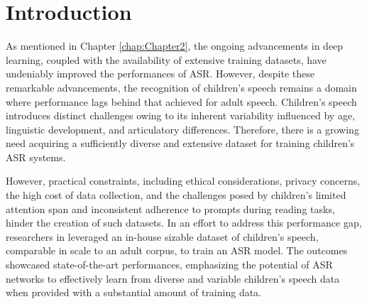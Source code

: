 \label{chap:6}
\cleardoublepage


\section{Introduction}
As mentioned in Chapter \ref{chap:Chapter2}, the ongoing advancements in deep learning, coupled with the availability of extensive training datasets, have undeniably improved the performances of ASR. However, despite these remarkable advancements, the recognition of children's speech remains a domain where performance lags behind that achieved for adult speech. Children's speech introduces distinct challenges owing to its inherent variability influenced by age, linguistic development, and articulatory differences. Therefore, there is a growing need acquiring a sufficiently diverse and extensive dataset for training children's ASR systems. 

However, practical constraints, including ethical considerations, privacy concerns, the high cost of data collection, and the challenges posed by children's limited attention span and inconsistent adherence to prompts during reading tasks, hinder the creation of such datasets. In an effort to address this performance gap, researchers in \cite{asr-google} leveraged an in-house sizable dataset of children's speech, comparable in scale to an adult corpus, to train an ASR model. The outcomes showcased state-of-the-art performances, emphasizing the potential of ASR networks to effectively learn from diverse and variable children's speech data when provided with a substantial amount of training data.

